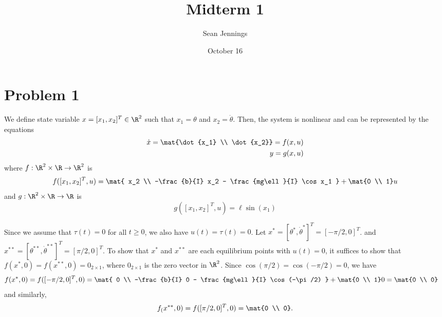 \documentclass{homework}
\title{Midterm 1}
\author{Sean Jennings}
\date{October 16}
\begin{document}
\maketitle

\section{Problem 1}

\begin{letterenum}
\item We define state variable $x = [x_1, x_2]^T\in \R^2$ such that $x_1 = \theta$
and $x_2 = \dot{\theta}$. Then, the system is nonlinear and can be represented by
the equations
\begin{align*}
    \dot{x} = \mat{\dot{x_1} \\ \dot{x_2}} = f(x, u) \\
    y = g(x, u)
\end{align*}
where $f: \R^2 \times \R \to \R^2$ is
\begin{equation*}
    f([x_1, x_2]^T, u) = \mat{
        x_2 \\
        -\frac{b}{I} x_2 - \frac{mg\ell}{I} \cos x_1
    } + \mat{0 \\ 1} u
\end{equation*}
and $g: \R^2 \times \R \to \R$ is
\begin{equation*}
    g([x_1, x_2]^T, u) = \ell \sin(x_1)
\end{equation*}

\item Since we assume that $\tau(t) = 0$ for all $t \geq 0$, we also have
    $u(t) = \tau(t) = 0$. Let $x^* = [\theta^*, \dot{\theta}^*]^T = [-\pi/2, 0]^T$.
    and $x^{**} = [\theta^{**}, \dot{\theta}^{**}]^T = [\pi/2, 0]^T$. To show
    that $x^*$ and $x^{**}$ are each equilibrium points with $u(t) = 0$,
    it suffices to show that $f(x^*, 0) = f(x^{**}, 0) = 0_{2\times 1}$, where
    $0_{2\times 1}$ is the zero vector in $\R^2$. Since
    $\cos(\pi/2) = \cos({-\pi/2}) = 0$, we have
    \begin{align*}
        f(x^*, 0) = f([-\pi/2, 0]^T, 0) = \mat{
            0 \\
            -\frac{b}{I} 0 - \frac{mg\ell}{I} \cos(-\pi/2)
        } + \mat{0 \\ 1} 0
        &= \mat{0 \\ 0}
    \end{align*}
    and similarly,
    \begin{align*}
        f_(x^{**}, 0) = f([\pi/2, 0]^T, 0) = \mat{0 \\ 0}.
    \end{align*}


\end{letterenum}
\end{document}
